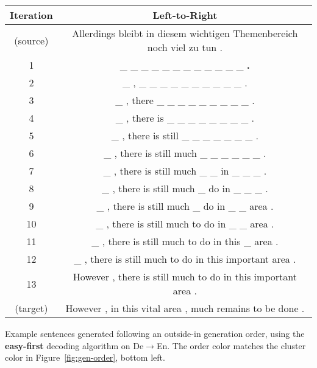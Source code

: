 \centering
\footnotesize
\begin{tabular}{cc}
\toprule
Iteration & {\color{orange} Left-to-Right} \\
\midrule
(source) & Allerdings bleibt in diesem wichtigen Themenbereich noch viel zu tun . \\
1 &  \_ \_ \_ \_ \_ \_ \_ \_ \_ \_ \_ \_ \textbf{.} \\ 
2 &  \_ , \_ \_ \_ \_ \_ \_ \_ \_ \_ \_ . \\ 
3 &  \_ , there \_ \_ \_ \_ \_ \_ \_ \_ \_ . \\ 
4 &  \_ , there is \_ \_ \_ \_ \_ \_ \_ \_ . \\ 
5 &  \_ , there is still \_ \_ \_ \_ \_ \_ \_ . \\ 
6 &  \_ , there is still much \_ \_ \_ \_ \_ \_ . \\ 
7 &  \_ , there is still much \_ \_ in \_ \_ \_ . \\ 
8 &  \_ , there is still much \_ do in \_ \_ \_ . \\ 
9 &  \_ , there is still much \_ do in \_ \_ area . \\ 
10 &  \_ , there is still much to do in \_ \_ area . \\ 
11 &  \_ , there is still much to do in this \_ area . \\ 
12 &  \_ , there is still much to do in this important area . \\ 
13 & However , there is still much to do in this important area . \\
(target) & However , in this vital area , much remains to be done . \\

\bottomrule
\end{tabular}

\caption{Example sentences generated following an {\color{orange} outside-in} generation order, using the \textbf{easy-first} decoding algorithm on De$\rightarrow$En. The order color matches the cluster color in Figure~\ref{fig:gen-order}, bottom left.}